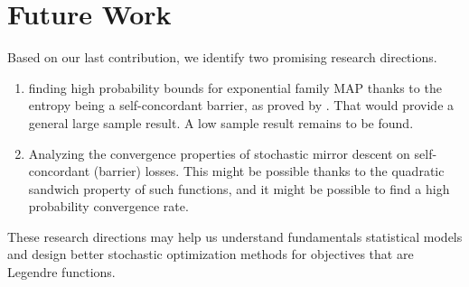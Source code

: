 \section{Future Work}
Based on our last contribution, we identify two promising research directions.
\begin{enumerate}
	\item finding high probability bounds for exponential family MAP thanks to the entropy being a self-concordant barrier, as proved by \citep{bubeck2015entropic}.
	That would provide a general large sample result. A low sample result remains to be found.
	\item Analyzing the convergence properties of stochastic mirror descent on self-concordant (barrier) losses. This might be possible thanks to the quadratic sandwich property of such functions, and it might be possible to find a high probability convergence rate. 
\end{enumerate}
These research directions may help us understand fundamentals statistical models and design better stochastic optimization methods for objectives that are Legendre functions.
